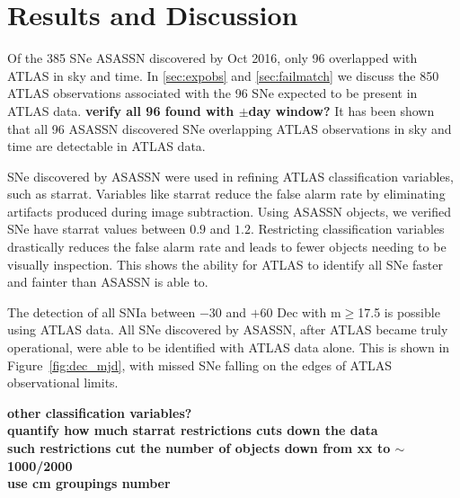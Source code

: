 \documentclass[aps,prb,twocolumn,superscriptaddress]{revtex4-1}
\begin{document}
\section{Results and Discussion}

\indent Of the 385 SNe ASASSN discovered by Oct 2016, only 96 overlapped
with ATLAS in sky and time.  
In \cref{sec:expobs} and \cref{sec:failmatch} we discuss the 850 
ATLAS observations associated with the 96 SNe expected to be 
present in ATLAS data.
{\bf verify all 96 found with $\pm$day window?}
It has been shown that all 96 ASASSN discovered SNe overlapping ATLAS 
observations in sky and time are detectable in ATLAS data.  

\indent SNe discovered by ASASSN were used in refining ATLAS classification 
variables, such as starrat.  Variables like starrat reduce the 
false alarm rate by eliminating artifacts produced during image 
subtraction.  Using ASASSN objects, we verified SNe have starrat values 
between $0.9$ and $1.2$.  
Restricting classification variables drastically reduces the false alarm rate and leads 
to fewer objects needing to be visually inspection. This shows the ability 
for ATLAS to identify all SNe faster and fainter than ASASSN is able to.

\indent The detection of all SNIa between $-30$ and 
$+60$ Dec with m$\geq$17.5 is possible using ATLAS data.  
All SNe discovered by ASASSN, after ATLAS became truly operational, were 
able to be identified with ATLAS data alone.  This is shown in 
Figure~\ref{fig:dec_mjd}, with missed SNe falling on the edges of ATLAS 
observational limits.


{\bf \noindent other classification variables?}\\
{\bf \noindent quantify how much starrat restrictions cuts down the data\\
\indent such restrictions cut the number of objects down from xx to $\sim$1000/2000\\
\indent use cm groupings number
}

\end{document}
